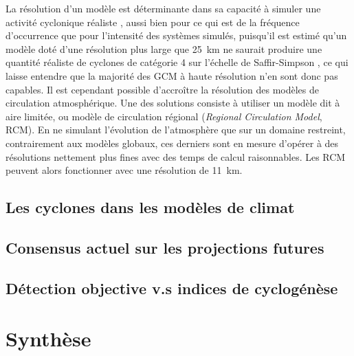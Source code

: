 \documentclass[../main.tex]{subfiles}
\begin{document}
La résolution d'un modèle est déterminante dans sa capacité à simuler une activité cyclonique réaliste \parencite{roberts_impact_2020}, aussi bien pour ce qui est de la fréquence d'occurrence que pour l'intensité des systèmes simulés, puisqu'il est estimé qu'un modèle doté d'une résolution plus large que \SI{25}{\kilo\metre} ne saurait produire une quantité réaliste de cyclones de catégorie 4 sur l'échelle de Saffir-Simpson \parencite{davis_resolving_2018}, ce qui laisse entendre que
la majorité des GCM à haute résolution n'en sont donc pas capables. Il est cependant possible d'accroître la résolution des modèles de circulation atmosphérique. Une des solutions consiste à utiliser un modèle dit à aire limitée, ou modèle de circulation régional (\textit{Regional Circulation Model}, RCM). En ne simulant l'évolution de l'atmosphère que sur un domaine restreint, contrairement aux modèles globaux, ces derniers sont en mesure d'opérer à des résolutions nettement plus fines
avec des temps de calcul raisonnables. Les RCM peuvent alors fonctionner avec une résolution de \SI{11}{\kilo\metre}.

\subsection{Les cyclones dans les modèles de climat}

\cite{manabe_tropical_1970}

\subsection{Consensus actuel sur les projections futures}\label{sec:projections_futures}

\cite{seneviratne_weather_2021}

\subsection{Détection objective v.s indices de cyclogénèse}\label{sec:tracking_vs_indices}

\section{Synthèse}
\end{document}
